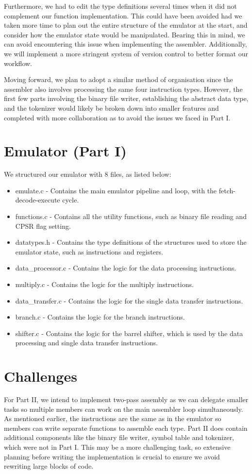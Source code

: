 \documentclass[letterpaper,11pt]{article}
\begin{document}
\noindent Furthermore, we had to edit the type definitions several times when it did not complement our function implementation. This could have been avoided had we taken more time to plan out the entire structure of the emulator at the start, and consider how the emulator state would be manipulated. Bearing this in mind, we can avoid encountering this issue when implementing the assembler. Additionally, we will implement a more stringent system of version control to better format our workflow.

\vspace{\baselineskip}

\noindent Moving forward, we plan to adopt a similar method of organisation since the assembler also involves processing the same four instruction types. However, the first few parts involving the binary file writer, establishing the abstract data type, and the tokenizer would likely be broken down into smaller features and completed with more collaboration as to avoid the issues we faced in Part I. 


\section{Emulator (Part I)}
We structured our emulator with 8 files, as listed below:
\begin{itemize}
\item emulate.c - Contains the main emulator pipeline and loop, with the fetch-decode-execute cycle.
\item functions.c - Contains all the utility functions, such as binary file reading and CPSR flag setting.
\item datatypes.h - Contains the type definitions of the structures used to store the emulator state, such as instructions and registers.
\item data\_processor.c - Contains the logic for the data processing instructions.
\item multiply.c - Contains the logic for the multiply instructions.
\item data\_transfer.c - Contains the logic for the single data transfer instructions.
\item branch.c - Contains the logic for the branch instructions.
\item shifter.c - Contains the logic for the barrel shifter, which is used by the data processing and single data transfer instructions.
\end{itemize}


\section{Challenges}

For Part II, we intend to implement two-pass assembly as we can delegate smaller tasks so multiple members can work on the main assembler loop simultaneously. As mentioned earlier, the instructions are the same as in the emulator so members can write separate functions to assemble each type. Part II does contain additional components like the binary file writer, symbol table and tokenizer, which were not in Part I. This may be a more challenging task, so extensive planning before writing the implementation is crucial to ensure we avoid rewriting large blocks of code.
\end{document}
